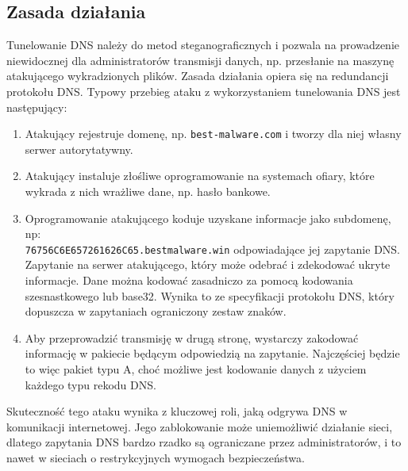 \documentclass{eiti-raport}
\begin{document}
\subsection{Zasada działania}
Tunelowanie DNS należy do metod steganograficznych i pozwala na prowadzenie niewidocznej dla administratorów transmisji danych, np. przesłanie na maszynę atakującego wykradzionych plików. Zasada działania opiera się na redundancji protokołu DNS. Typowy przebieg ataku z wykorzystaniem tunelowania DNS jest następujący:
\begin{enumerate}
	\item Atakujący rejestruje domenę, np. \texttt{best-malware.com} i tworzy dla niej własny serwer autorytatywny. 
	\item Atakujący instaluje złośliwe oprogramowanie na systemach ofiary, które wykrada z nich wrażliwe dane, np. hasło bankowe. 
	\item Oprogramowanie atakującego koduje uzyskane informacje jako subdomenę, np: \\  \texttt{76756C6E657261626C65.bestmalware.win} odpowiadające jej zapytanie DNS. Zapytanie na serwer atakującego, który może odebrać i zdekodować ukryte informacje. Dane można kodować zasadniczo za pomocą kodowania szesnastkowego lub base32. Wynika to ze specyfikacji protokołu DNS, który dopuszcza w zapytaniach ograniczony zestaw znaków. 
	\item Aby przeprowadzić transmisję w drugą stronę, wystarczy zakodować informację w pakiecie będącym odpowiedzią na zapytanie. Najczęściej będzie to więc pakiet typu A, choć możliwe jest kodowanie danych z użyciem każdego typu rekodu DNS. 
\end{enumerate}
Skuteczność tego ataku wynika z kluczowej roli, jaką odgrywa DNS w komunikacji internetowej. Jego zablokowanie może uniemożliwić działanie sieci, dlatego zapytania DNS bardzo rzadko są ograniczane przez administratorów, i to nawet w sieciach o restrykcyjnych wymogach bezpieczeństwa. 
\end{document}
